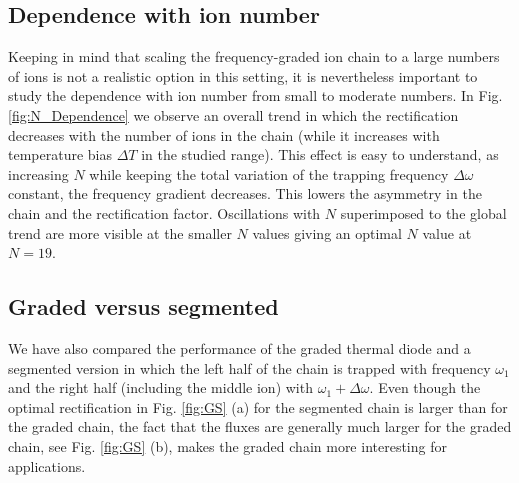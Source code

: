 %
%
%
\subsection{Dependence with ion number\label{IN}}
%
Keeping in mind that scaling the frequency-graded ion chain  to a large numbers of ions is not a realistic option in this setting,
it is nevertheless important to
study the dependence with ion number from small to moderate numbers.  In Fig. \ref{fig:N_Dependence} we observe an overall trend in which the rectification decreases with the number of ions in the chain (while it increases with temperature bias $\Delta T$ in the studied range). This effect is easy to understand, as increasing $N$
while keeping the total variation of the trapping frequency $\Delta \omega$ constant, the frequency gradient  decreases. This
lowers  the  asymmetry in the chain and the rectification factor. Oscillations with $N$ superimposed to the global trend are more visible at the smaller $N$ values giving  an optimal $N$ value at $N=19$.

\subsection{Graded versus segmented\label{GS}}
%
We have also compared the performance of the graded thermal diode and a segmented version in which the left half of the chain is trapped with frequency $\omega_1$ and the right half (including the middle ion) with $\omega_1+\Delta \omega$. Even though the optimal rectification  in Fig. \ref{fig:GS} (a)  for the segmented chain is larger than for the graded chain, the fact that the fluxes are generally much larger for the graded chain, see Fig. \ref{fig:GS} (b), makes the graded chain more interesting for applications.




